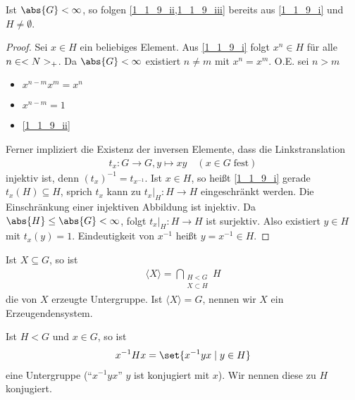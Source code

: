 \begin{proposition}
	Ist $\abs{G} < \infty$, so folgen \cref{1_1_9_ii,1_1_9_iii} bereits aus \cref{1_1_9_i} und $H \neq \emptyset$.
\end{proposition}
\begin{proof}
	Sei $x \in H$ ein beliebiges Element. Aus \ref{1_1_9_i} folgt $x^n \in H$ für alle $n \in <N>_{+}$. Da $\abs{G} < \infty$ existiert $n\neq m$ mit $x^n = x^m$. O.E. sei $n > m$ \begin{itemize}[label={$\Rightarrow$},topsep=-\parskip]
		 \item $x^{n-m} x^m = x^n$
		 \item $x^{n-m} = 1$
		 \item \ref{1_1_9_ii}
	\end{itemize}
	Ferner impliziert die Existenz der inversen Elemente, dass die Linkstranslation \begin{align*}
		t_x\colon G \to G, y \mapsto xy\quad(x\in G\;\text{fest})
	\end{align*}
	injektiv ist, denn $(t_x)^{-1} = t_{x^{-1}}$. Ist $x \in H$, so heißt \ref{1_1_9_i} gerade $t_x(H) \subseteq H$, sprich $t_x$ kann zu $t_x\big|_H\colon H \to H$ eingeschränkt werden. Die Einschränkung einer injektiven Abbildung ist injektiv. Da $\abs{H} \le \abs{G} < \infty$, folgt $t_x\big|_H\colon H \to H$ ist surjektiv. Also existiert $y \in H$ mit $t_x(y)= 1$. Eindeutigkeit von $x^{-1}$ heißt $y = x^{-1} \in H$.
\end{proof}

\begin{definition}[Erzeugendensystem]
	Ist $X \subseteq G$, so ist
	\begin{align*}
		\langle X \rangle = \bigcap_{\substack{H < G\\X \subset H}} H
	\end{align*}
	die von $X$ erzeugte Untergruppe. Ist $\langle X \rangle = G$, nennen wir $X$ ein Erzeugendensystem.
\end{definition}

\begin{definition}[Konjugation]
	Ist $H < G$ und $x \in G$, so ist\begin{align*}
		x^{-1}Hx = \set{x^{-1}yx\mid y \in H}
	\end{align*}
	eine Untergruppe ("`$x^{-1}yx$"' $y$ ist konjugiert mit $x$). Wir nennen diese zu $H$ konjugiert.
\end{definition}


